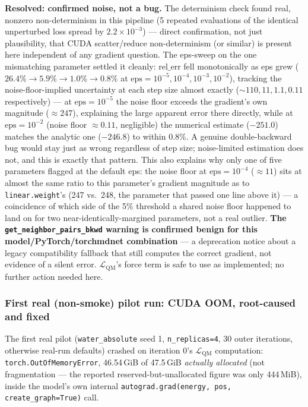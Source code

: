 \documentclass[11pt]{article}
\begin{document}
\textbf{Resolved: confirmed noise, not a bug.} The determinism check found
real, nonzero non-determinism in this pipeline (5 repeated evaluations of
the identical unperturbed loss spread by $2.2{\times}10^{-3}$) --- direct
confirmation, not just plausibility, that CUDA scatter/reduce
non-determinism (or similar) is present here independent of any gradient
question. The eps-sweep on the one mismatching parameter settled it
cleanly: $\text{rel\_err}$ fell monotonically as eps grew ($26.4\%
\to 5.9\% \to 1.0\% \to 0.8\%$ at $\text{eps}=10^{-5},10^{-4},10^{-3},10^{-2}$),
tracking the noise-floor-implied uncertainty at each step size almost
exactly ($\sim\!110, 11, 1.1, 0.11$ respectively) --- at $\text{eps}=10^{-5}$
the noise floor exceeds the gradient's own magnitude ($\approx\!247$),
explaining the large apparent error there directly, while at
$\text{eps}=10^{-2}$ (noise floor $\approx\!0.11$, negligible) the
numerical estimate ($-251.0$) matches the analytic one ($-246.8$) to
within 0.8\%. A genuine double-backward bug would stay just as wrong
regardless of step size; noise-limited estimation does not, and this is
exactly that pattern. This also explains why only one of five parameters
flagged at the default eps: the noise floor at $\text{eps}=10^{-4}$
($\approx\!11$) sits at almost the same ratio to this parameter's gradient
magnitude as to \texttt{linear.weight}'s (247 vs.\ 248, the parameter that
passed one line above it) --- a coincidence of which side of the 5\%
threshold a shared noise floor happened to land on for two
near-identically-margined parameters, not a real outlier. \textbf{The
\texttt{get\_neighbor\_pairs\_bkwd} warning is confirmed benign for this
model/PyTorch/torchmdnet combination} --- a deprecation notice about a
legacy compatibility fallback that still computes the correct gradient,
not evidence of a silent error. $\mathcal{L}_{\text{QM}}$'s force term is
safe to use as implemented; no further action needed here.

\subsubsection{First real (non-smoke) pilot run: CUDA OOM, root-caused and fixed}
\label{sec:q4-stable-oom}

The first real pilot (\texttt{water\_absolute} seed 1, \texttt{n\_replicas=4},
30 outer iterations, otherwise real-run defaults) crashed on iteration 0's
$\mathcal{L}_{\text{QM}}$ computation: \texttt{torch.OutOfMemoryError},
46.54\,GiB of 47.5\,GiB \emph{actually allocated} (not fragmentation --- the
reported reserved-but-unallocated figure was only 444\,MiB), inside the
model's own internal \texttt{autograd.grad(energy, pos,
create\_graph=True)} call.
\end{document}
